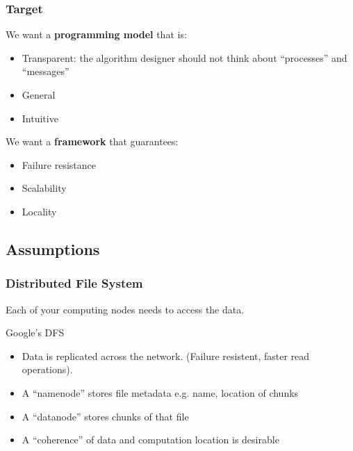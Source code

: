 \begin{frame}\frametitle{Target}
  We want a {\bf programming model} that is:
\begin{itemize}
 \item Transparent: the algorithm designer should not think about ``processes'' and ``messages''
 \item General 
 \item Intuitive
\end{itemize}
 We want a {\bf framework} that guarantees:
\begin{itemize}
 \item Failure resistance
 \item Scalability
 \item Locality
\end{itemize}
\end{frame}
% 
% 

\subsection{Assumptions}

\begin{frame}
 \frametitle{Distributed File System}
 Each of your computing nodes needs to access the data.
 \vspace{2em}

 \begin{block}{Google's DFS}
 \begin{itemize}
  \item Data is replicated across the network. (Failure resistent, faster read operations).
  \item<2-> A ``namenode'' stores file metadata e.g. name, location of chunks
  \item<3-> A ``datanode'' stores chunks of that file
  \item<4-> A ``coherence'' of data and computation location is desirable
 \end{itemize}
 \end{block}
\end{frame}

